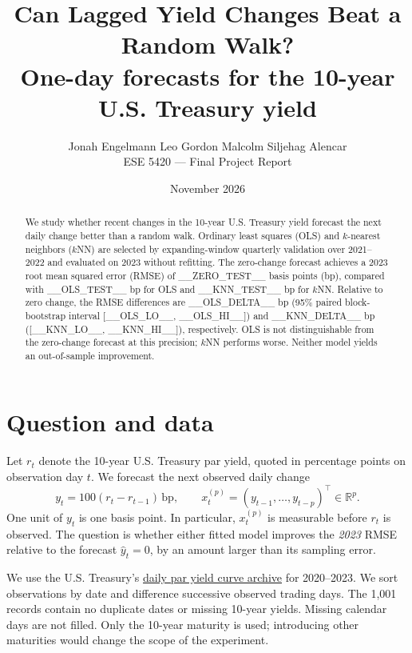 \documentclass[10pt,letterpaper]{article}
\title{\vspace{-2em}\textbf{Can Lagged Yield Changes Beat a Random Walk?}\\[2mm]
\large One-day forecasts for the 10-year U.S. Treasury yield}
\author{Jonah Engelmann \qquad Leo Gordon \qquad Malcolm Siljehag Alencar\\
\normalsize ESE 5420 --- Final Project Report}
\date{November 2026}
\newcommand{\bp}{\,\mathrm{bp}}
\begin{document}
\maketitle
\vspace{-1.25em}
\begin{abstract}
We study whether recent changes in the 10-year U.S. Treasury yield forecast the next daily change better than a random walk. Ordinary least squares (OLS) and $k$-nearest neighbors ($k$NN) are selected by expanding-window quarterly validation over 2021--2022 and evaluated on 2023 without refitting. The zero-change forecast achieves a 2023 root mean squared error (RMSE) of __ZERO_TEST__ basis points (bp), compared with __OLS_TEST__ bp for OLS and __KNN_TEST__ bp for $k$NN. Relative to zero change, the RMSE differences are __OLS_DELTA__ bp (95\% paired block-bootstrap interval [__OLS_LO__, __OLS_HI__]) and __KNN_DELTA__ bp ([__KNN_LO__, __KNN_HI__]), respectively. OLS is not distinguishable from the zero-change forecast at this precision; $k$NN performs worse. Neither model yields an out-of-sample improvement.
\end{abstract}

\section{Question and data}
Let $r_t$ denote the 10-year U.S. Treasury par yield, quoted in percentage points on observation day $t$. We forecast the next observed daily change
\begin{equation}
    y_t=100(r_t-r_{t-1})\bp,
    \qquad x_t^{(p)}=(y_{t-1},\ldots,y_{t-p})^\top\in\mathbb R^p.
    \label{eq:features}
\end{equation}
One unit of $y_t$ is one basis point. In particular, $x_t^{(p)}$ is measurable before $r_t$ is observed. The question is whether either fitted model improves the \emph{2023} RMSE relative to the forecast $\widehat y_t=0$, by an amount larger than its sampling error.

We use the U.S. Treasury's \href{https://home.treasury.gov/resource-center/data-chart-center/interest-rates/daily-treasury-rate-archives/par-yield-curve-rates-2020-2023.csv}{daily par yield curve archive} for 2020--2023. We sort observations by date and difference successive observed trading days. The 1,001 records contain no duplicate dates or missing 10-year yields. Missing calendar days are not filled. Only the 10-year maturity is used; introducing other maturities would change the scope of the experiment.
\end{document}
